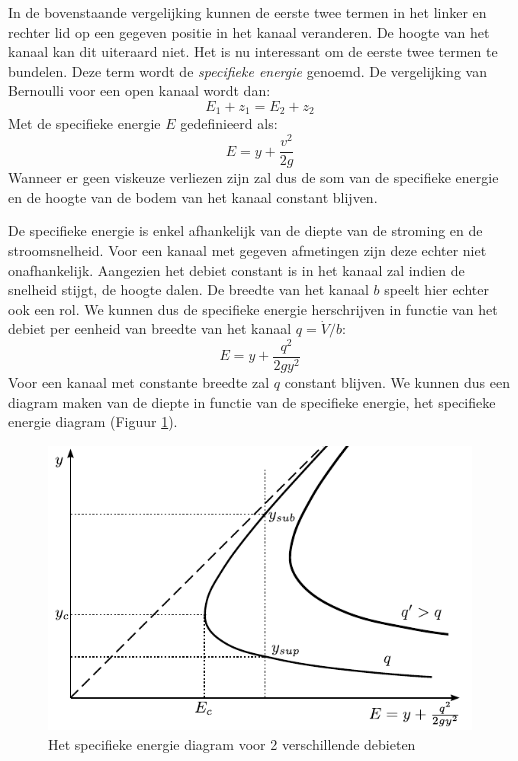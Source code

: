 In de bovenstaande vergelijking kunnen de eerste twee termen in het linker en rechter lid op een gegeven positie in het kanaal veranderen. De hoogte van het kanaal kan dit uiteraard niet. Het is nu interessant om de eerste twee termen te bundelen. Deze term wordt de \emph{specifieke energie} genoemd. De vergelijking van Bernoulli voor een open kanaal wordt dan:
\begin{equation}
	E_1 + z_1 = E_2 + z_2
\end{equation}
Met de specifieke energie $E$ gedefinieerd als:
\begin{equation}
	E = y + \frac{v^2}{2 g}
\end{equation}
Wanneer er geen viskeuze verliezen zijn zal dus de som van de specifieke energie en de hoogte van de bodem van het kanaal constant blijven.

De specifieke energie is enkel afhankelijk van de diepte van de stroming en de stroomsnelheid. Voor een kanaal met gegeven afmetingen zijn deze echter niet onafhankelijk. Aangezien het debiet constant is in het kanaal zal indien de snelheid stijgt, de hoogte dalen. De breedte van het kanaal $b$ speelt hier echter ook een rol. We kunnen dus de specifieke energie herschrijven in functie van het debiet per eenheid van breedte van het kanaal $q = \dot{V}/b$:
\begin{equation}
	E = y + \frac{q^2}{2 g y^2}
\end{equation}
Voor een kanaal met constante breedte zal $q$ constant blijven. We kunnen dus een diagram maken van de diepte in functie van de specifieke energie, het specifieke energie diagram (Figuur \ref{fig:Specifieke_energie_diagram}).
\begin{figure}[htb]
	\centering
	\includegraphics{fig/kanaalstroming/Specifieke_energie_diagram}
	\caption{Het specifieke energie diagram voor 2 verschillende debieten}
	\label{fig:Specifieke_energie_diagram}
\end{figure}
